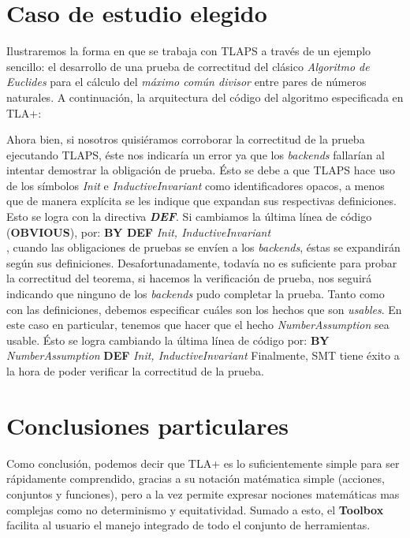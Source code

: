 \documentclass[spanish]{llncs}
\begin{document}
\section{Caso de estudio elegido}

Ilustraremos la forma en que se trabaja con TLAPS a través de un ejemplo sencillo\cite{example}: 
el desarrollo de una prueba de correctitud del clásico \textit{Algoritmo de Euclides} para el cálculo del \textit{máximo común divisor} entre pares de números naturales.
A continuación, la arquitectura del código del algoritmo especificada en TLA+:
  
  
Ahora bien, si nosotros quisiéramos corroborar la correctitud de la prueba ejecutando TLAPS, éste nos indicaría un error ya que los \textit{backends} fallarían al intentar demostrar la obligación de prueba. Ésto se debe a que TLAPS
hace uso de los símbolos \textit{Init} e \textit{InductiveInvariant} como identificadores opacos, a menos que de manera explícita se les indique que expandan sus respectivas definiciones. Esto se logra con la directiva \textbf{\textit{DEF}}. 
Si cambiamos la última línea de código (\textbf{OBVIOUS}), por:
\subitem \textbf{BY DEF} \textit{Init, InductiveInvariant}\\
, cuando las obligaciones de pruebas se envíen a los \textit{backends}, éstas se expandirán según sus definiciones. Desafortunadamente, todavía no es suficiente para probar la correctitud del teorema, si hacemos la verificación de prueba, nos seguirá indicando que ninguno de los \textit{backends} pudo completar la prueba.
Tanto como con las definiciones, debemos especificar cuáles son los hechos que son \textit{usables}. En este caso en particular, tenemos que hacer que el hecho \textit{NumberAssumption} sea usable. Ésto se logra cambiando la última línea de código por:
\subitem \textbf{BY} \textit{NumberAssumption} \textbf{DEF} \textit{Init, InductiveInvariant}
Finalmente, SMT tiene éxito a la hora de poder verificar la correctitud de la prueba.


\section{Conclusiones particulares}

Como conclusión, podemos decir que TLA+ es lo suficientemente simple para ser rápidamente comprendido, gracias a su notación matématica simple (acciones, conjuntos y funciones), 
pero a la vez permite expresar nociones matemáticas mas complejas como no determinismo y equitatividad. Sumado a esto, el \textbf{Toolbox} facilita al usuario el manejo integrado de todo el conjunto de herramientas. 
\end{document}
